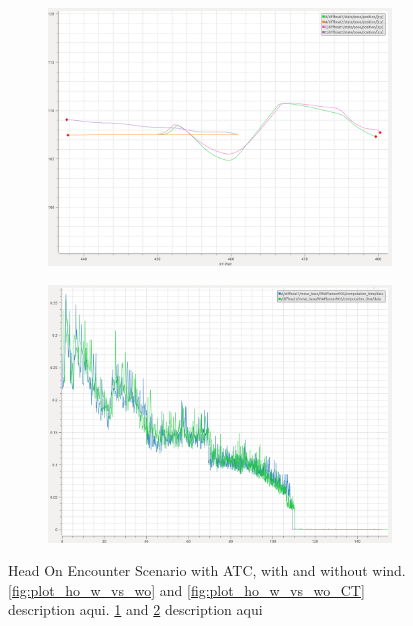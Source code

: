 \begin{figure}[H]
            \begin{subfigure}[b]{0.49\textwidth}
                \centering
                \includegraphics[width=\textwidth]{figs/Chap5/plot_ho_w_vs_wind.png}
                \caption{}
                \label{fig:plot_ho_w_vs_wind}
            \end{subfigure}
            \begin{subfigure}[b]{0.49\textwidth}
                \centering
                \includegraphics[width=\textwidth]{figs/Chap5/plot_ho_w_vs_wind_CT.png}
                \caption{}
                \label{fig:plot_ho_w_vs_wind_CT}
            \end{subfigure}
        
        \caption{Head On Encounter Scenario with ATC, with and without wind. \ref{fig:plot_ho_w_vs_wo} and \ref{fig:plot_ho_w_vs_wo_CT}  description aqui. \ref{fig:plot_ho_w_vs_wind} and \ref{fig:plot_ho_w_vs_wind_CT} description aqui}
        \label{fig:plots_ho}
        \end{figure}
        
